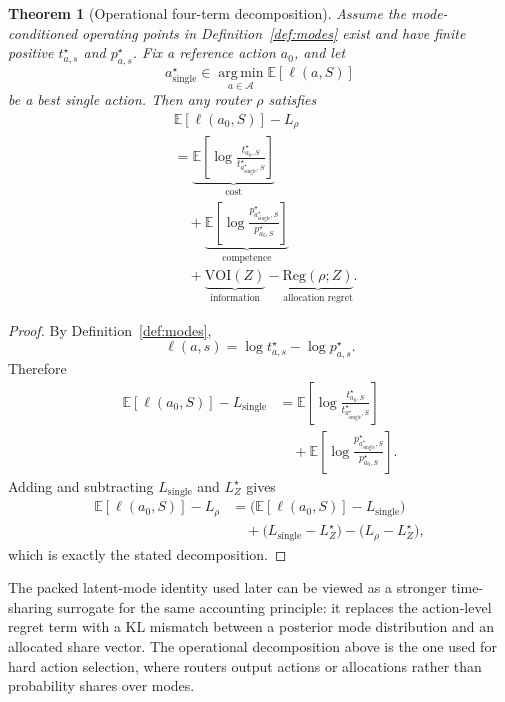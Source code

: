 \documentclass[10pt,twocolumn]{article}
\theoremstyle{definition}
\theoremstyle{plain}
\newtheorem{theorem}{Theorem}
\theoremstyle{remark}
\begin{document}
\begin{theorem}[Operational four-term decomposition]
\label{thm:operational-four-term}
Assume the mode-conditioned operating points in Definition~\ref{def:modes}
exist and have finite positive \(t^\star_{a,s}\) and \(p^\star_{a,s}\).  Fix a
reference action \(a_0\), and let
\[
    a_{\mathrm{single}}^\star
    \in
    \operatorname*{arg\,min}_{a\in\mathcal A}
    \mathbb E[\ell(a,S)]
\]
be a best single action.  Then any router \(\rho\) satisfies
\[
\begin{aligned}
&\mathbb E[\ell(a_0,S)]-L_\rho
\\
&=
\underbrace{
  \mathbb E
  \!\left[
      \log
      \frac{t^\star_{a_0,S}}
           {t^\star_{a_{\mathrm{single}}^\star,S}}
  \right]
}_{\text{cost}}
\\
&\quad+
\underbrace{
  \mathbb E
  \!\left[
      \log
      \frac{p^\star_{a_{\mathrm{single}}^\star,S}}
           {p^\star_{a_0,S}}
  \right]
}_{\text{competence}}
\\
&\quad+
\underbrace{\mathrm{VOI}(Z)}_{\text{information}}
-
\underbrace{\mathrm{Reg}(\rho;Z)}_{\text{allocation regret}} .
\end{aligned}
\]
\end{theorem}

\begin{proof}
By Definition~\ref{def:modes},
\[
    \ell(a,s)=\log t^\star_{a,s}-\log p^\star_{a,s}.
\]
Therefore
\[
\begin{aligned}
\mathbb E[\ell(a_0,S)]-L_{\mathrm{single}}
&=
\mathbb E
\!\left[
    \log
    \frac{t^\star_{a_0,S}}
         {t^\star_{a_{\mathrm{single}}^\star,S}}
\right]
\\
&\quad
+
\mathbb E
\!\left[
    \log
    \frac{p^\star_{a_{\mathrm{single}}^\star,S}}
         {p^\star_{a_0,S}}
\right].
\end{aligned}
\]
Adding and subtracting \(L_{\mathrm{single}}\) and \(L_Z^\star\) gives
\[
\begin{aligned}
\mathbb E[\ell(a_0,S)]-L_\rho
&=
\bigl(\mathbb E[\ell(a_0,S)]-L_{\mathrm{single}}\bigr)
\\
&\quad
+
\bigl(L_{\mathrm{single}}-L_Z^\star\bigr)
-
\bigl(L_\rho-L_Z^\star\bigr),
\end{aligned}
\]
which is exactly the stated decomposition.
\end{proof}

The packed latent-mode identity used later can be viewed as a stronger
time-sharing surrogate for the same accounting principle: it replaces the
action-level regret term with a KL mismatch between a posterior mode
distribution and an allocated share vector.  The operational decomposition
above is the one used for hard action selection, where routers output actions
or allocations rather than probability shares over modes.



\end{document}
